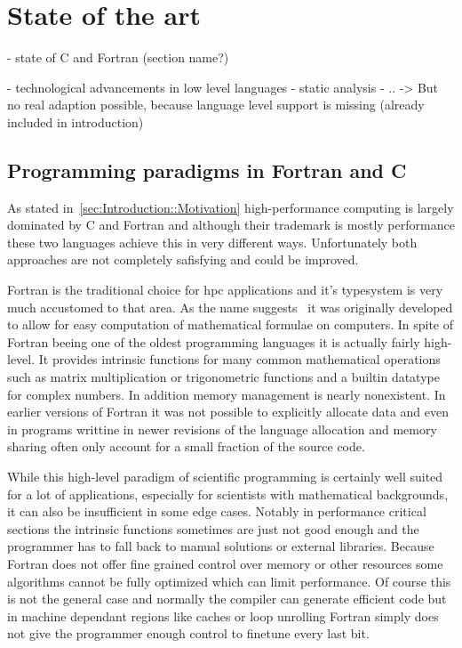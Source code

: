 \chapter{State of the art}
\label{ch:State_of_the_art}


- state of C and Fortran (section name?)

- technological advancements in low level languages
    - static analysis
    - ..
    -> But no real adaption possible, because language level support is missing (already included in introduction)

\section{Programming paradigms in Fortran and C} %
\label{sec:State_of_the_art::Paradigms}

As stated in~\autoref{sec:Introduction::Motivation} high-performance computing is largely dominated by C and Fortran and although their trademark is mostly performance these two languages achieve this in very different ways. Unfortunately both approaches are not completely safisfying and could be improved.

Fortran is the traditional choice for \gls{hpc} applications and it's typesystem is very much accustomed to that area. As the name suggests~ it was originally developed to allow for easy computation of mathematical formulae on computers. In spite of Fortran beeing one of the oldest programming languages it is actually fairly high-level. It provides \gls{intrinsic} functions for many common mathematical operations such as matrix multiplication or trigonometric functions and a builtin datatype for complex numbers. In addition memory management is nearly nonexistent. In earlier versions of Fortran it was not possible to explicitly allocate data and even in programs writtine in newer revisions of the language allocation and memory sharing often only account for a small fraction of the source code.

While this high-level paradigm of scientific programming is certainly well suited for a lot of applications, especially for scientists with mathematical backgrounds, it can also be insufficient in some edge cases. Notably in performance critical sections the \gls{intrinsic} functions sometimes are just not good enough and the programmer has to fall back to manual solutions or external libraries. Because Fortran does not offer fine grained control over memory or other resources some algorithms cannot be fully optimized which can limit performance. Of course this is not the general case and normally the compiler can generate efficient code but in machine dependant regions like caches or loop unrolling Fortran simply does not give the programmer enough control to finetune every last bit.

